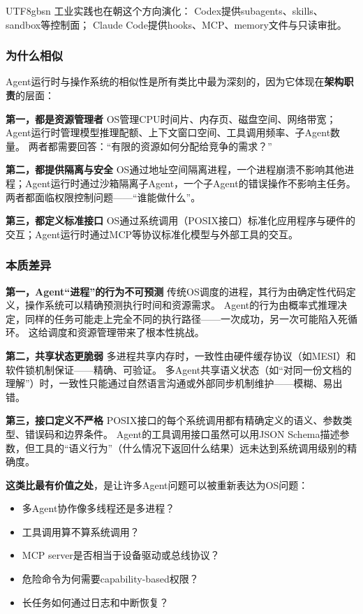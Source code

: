 \documentclass[11pt,a4paper]{article}
\begin{document}
\begin{CJK*}{UTF8}{gbsn}
工业实践也在朝这个方向演化：
Codex提供subagents、skills、sandbox等控制面\cite{openai_codex_overview_2026}；
Claude Code提供hooks、MCP、memory文件与只读审批\cite{anthropic_claudecode_overview_2026}。

\subsubsection{为什么相似}

Agent运行时与操作系统的相似性是所有类比中最为深刻的，因为它体现在\textbf{架构职责}的层面：

\textbf{第一，都是资源管理者}
OS管理CPU时间片、内存页、磁盘空间、网络带宽；Agent运行时管理模型推理配额、上下文窗口空间、工具调用频率、子Agent数量。
两者都需要回答：``有限的资源如何分配给竞争的需求？''

\textbf{第二，都提供隔离与安全}
OS通过地址空间隔离进程，一个进程崩溃不影响其他进程\cite{ostep_2023}；Agent运行时通过沙箱隔离子Agent，一个子Agent的错误操作不影响主任务\cite{openai_codex_sandbox_2026,anthropic_claudecode_sandbox_2026}。
两者都面临权限控制问题——``谁能做什么''。

\textbf{第三，都定义标准接口}
OS通过系统调用（POSIX接口）标准化应用程序与硬件的交互；Agent运行时通过MCP等协议标准化模型与外部工具的交互\cite{mcp_intro_2026}。

\subsubsection{本质差异}

\textbf{第一，Agent``进程''的行为不可预测}
传统OS调度的进程，其行为由确定性代码定义，操作系统可以精确预测执行时间和资源需求。
Agent的行为由概率式推理决定，同样的任务可能走上完全不同的执行路径——一次成功，另一次可能陷入死循环。
这给调度和资源管理带来了根本性挑战。

\textbf{第二，共享状态更脆弱}
多进程共享内存时，一致性由硬件缓存协议（如MESI）和软件锁机制保证——精确、可验证。
多Agent共享语义状态（如``对同一份文档的理解''）时，一致性只能通过自然语言沟通或外部同步机制维护——模糊、易出错。

\textbf{第三，接口定义不严格}
POSIX接口的每个系统调用都有精确定义的语义、参数类型、错误码和边界条件。
Agent的工具调用接口虽然可以用JSON Schema描述参数，但工具的``语义行为''（什么情况下返回什么结果）远未达到系统调用级别的精确度。

\textbf{这类比最有价值之处}，是让许多Agent问题可以被重新表达为OS问题：
\begin{itemize}[nosep]
\item 多Agent协作像多线程还是多进程？\cite{wu2023autogen}
\item 工具调用算不算系统调用？
\item MCP server是否相当于设备驱动或总线协议？\cite{mcp_intro_2026}
\item 危险命令为何需要capability-based权限？\cite{debenedetti2025camel}
\item 长任务如何通过日志和中断恢复？\cite{openai_codex_approvals_2026}
\end{itemize}


\end{CJK*}
\end{document}
